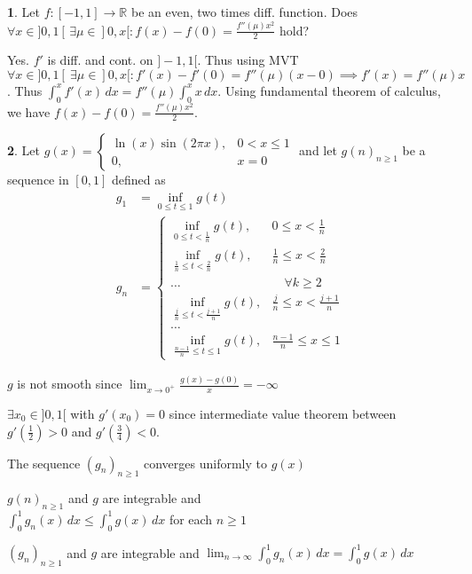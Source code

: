 \documentclass[a4paper, 10pt]{article}
\theoremstyle{definition}
\theoremstyle{ex}
\newtheorem*{exercise}{}
\theoremstyle{named}
\newcommand{\R}{\mathbb{R}}
\begin{document}
\begin{exercise}
    Let $f: [-1, 1] \to \R$ be an even, two times diff. function. Does $\forall x \in ]0, 1[ \, \exists \mu \in ]0, x[ : f(x) - f(0) = \frac{f''(\mu)x^2}{2}$ hold?
    \begin{exanswers}
        \item Yes. $f'$ is diff. and cont. on $]-1, 1[$. Thus using MVT $\forall x \in ]0, 1[ \ \exists \mu \in ]0, x[ : f'(x) - f'(0) = f''(\mu)(x - 0) \implies f'(x) = f''(\mu) x$. Thus $\int_0^x f'(x) \,dx = f''(\mu) \int_0^x x \,dx$. Using fundamental theorem of calculus, we have $f(x) - f(0) = \frac{f''(\mu)x^2}{2}$.
    \end{exanswers}
\end{exercise}

\begin{exercise}
    Let $g(x) = \begin{cases}
        \ln(x)\sin(2 \pi x), & 0 < x \leq 1 \\
        0, & x = 0
    \end{cases}$ and let $g(n)_{n \geq 1}$ be a sequence in $[0, 1]$ defined as
    \begin{align*}
        g_1 &= \inf_{0 \leq t \leq 1} g(t) \\
        g_n &= \begin{cases}
            \inf_{0 \leq t < \frac{1}{n}} g(t), & 0 \leq x < \frac{1}{n} \\
            \inf_{\frac{1}{n} \leq t < \frac{2}{n}} g(t), & \frac{1}{n} \leq x < \frac{2}{n} \\
            \ldots & \quad \forall k \geq 2 \\
            \inf_{\frac{j}{n} \leq t < \frac{j + 1}{n}} g(t), & \frac{j}{n} \leq x < \frac{j + 1}{n} \\
            \ldots \\
            \inf_{\frac{n - 1}{n} \leq t \leq 1} g(t), & \frac{n - 1}{n} \leq x \leq 1
        \end{cases}
    \end{align*}

    \begin{exanswers}
        \item $g$ is not smooth since $\lim_{x \to 0^+} \frac{g(x) - g(0)}{x} = -\infty$
        \item $\exists x_0 \in ]0, 1[$ with $g'(x_0) = 0$ since intermediate value theorem between $g'(\frac{1}{2}) > 0$ and $g'(\frac{3}{4}) < 0$.
        \item The sequence $(g_n)_{n \geq 1}$ converges uniformly to $g(x)$
        \item $g(n)_{n \geq 1}$ and $g$ are integrable and \\ $\int_0^1 g_n(x) \,dx \leq \int_0^1 g(x) \,dx$ for each $n \geq 1$
        \item $(g_n)_{n \geq 1}$ and $g$ are integrable and $\lim_{n \to \infty} \int_0^1 g_n(x) \,dx = \int_0^1 g(x) \,dx$
    \end{exanswers}
\end{exercise}
\end{document}
